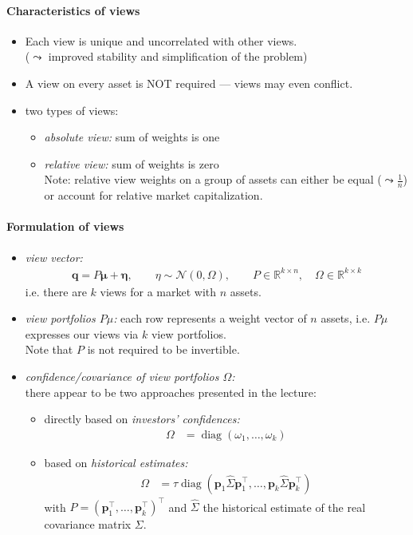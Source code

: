 \documentclass[a4paper,landscape,8pt,fleqn]{scrartcl}
\DeclareMathOperator{\diag}{diag}				%
\begin{document}
\begin{multicols*}{3}
\paragraph{Characteristics of views}
\begin{itemize}
\item Each view is unique and uncorrelated with other views. \\
($\leadsto$ improved stability and simplification of the problem)
\item A view on every asset is NOT required --- views may even conflict.
\item two types of views:
\begin{itemize}
\item \textit{absolute view:} sum of weights is one
\item \textit{relative view:} sum of weights is zero \\
Note: relative view weights on a group of assets can either be equal ($\leadsto \frac{1}{n}$) or account for relative market capitalization.
\end{itemize}
\end{itemize}

\paragraph{Formulation of views}
\begin{itemize}
\item \textit{view vector:}
\begin{align*}
\bm q = P \bm \mu + \bm \eta, \qquad \eta \sim \mathcal{N}(0, \Omega), \qquad P \in \mathbb{R}^{k \times n}, \quad \Omega \in \mathbb{R}^{k \times k}
\end{align*}
i.e. there are $k$ views for a market with $n$ assets.
\item \textit{view portfolios $P \mu$:} each row represents a weight vector of $n$ assets, i.e. $P \mu$ expresses our views via $k$ view portfolios. \\
Note that $P$ is not required to be invertible.
\item \textit{confidence/covariance of view portfolios $\Omega$:} \\
there appear to be two approaches presented in the lecture:
\begin{itemize}
\item directly based on \textit{investors' confidences:}
\begin{align*}
\Omega &= \diag(\omega_1, \ldots, \omega_k)
\end{align*}
\item based on \textit{historical estimates:}
\begin{align*}
\Omega &= \tau \diag(\bm p_1 \hat \Sigma \bm p_1^\top, \ldots, \bm p_k \hat \Sigma \bm p_k^\top)
\end{align*}
with $P = (\bm p_1^\top, \ldots, \bm p_k^\top)^\top$ and $\hat \Sigma$ the historical estimate of the real covariance matrix $\Sigma$.
\end{itemize}
\end{itemize}


\end{multicols*}
\end{document}
